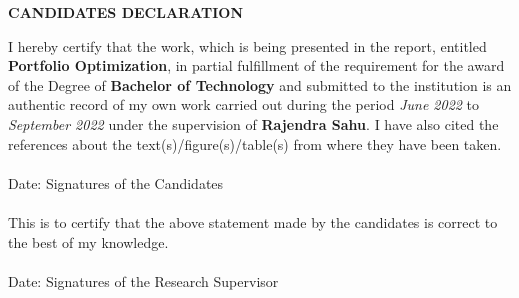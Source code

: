 \newpage
\begin{center}
{\large \bf CANDIDATES DECLARATION}
\end{center}
I hereby certify that the work, which is being presented in the report, entitled {\bf Portfolio Optimization}, in partial fulfillment of the requirement for the award of the
Degree of {\bf Bachelor of Technology} and submitted to the institution is an authentic record of my own work carried out
during the period \emph{June 2022} to \emph{September 2022} under the supervision of {\bf Rajendra Sahu}.
I have also cited the references about the text(s)/figure(s)/table(s) from where they have been taken.\\
\vspace{0.6in} \\
Date: \hspace{3.4in} Signatures of the Candidates \\
\vspace{0.2in} \\
This is to certify that the above statement made by the candidates is correct to the best of my knowledge. \\
\vspace{0.5in} \\
Date: \hspace{2.65in} Signatures of the Research Supervisor \\

